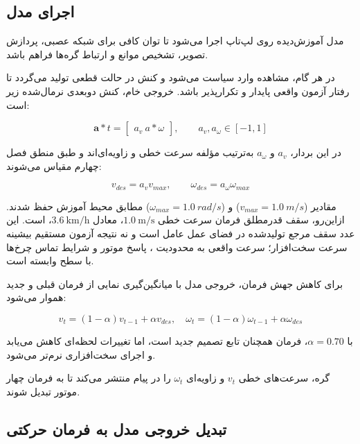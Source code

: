 \subsection{اجرای مدل }
\label{subsec:real_lstm_sac_execution}

مدل آموزش‌دیده روی لپ‌تاپ اجرا می‌شود تا توان کافی برای شبکه عصبی، پردازش تصویر، تشخیص موانع و ارتباط گره‌ها فراهم باشد.

در هر گام، مشاهده وارد سیاست می‌شود و کنش در حالت قطعی تولید می‌گردد تا رفتار آزمون واقعی پایدار و تکرارپذیر باشد. خروجی خام، کنش دوبعدی نرمال‌شده زیر است:

\begin{equation}
	\mathbf{a}*t =
	\begin{bmatrix}
		a_v \
		a*\omega
	\end{bmatrix},
	\qquad
	a_v,a_\omega \in [-1,1]
	\label{eq:real_policy_action}
\end{equation}

در این بردار، $a_v$ و $a_\omega$ به‌ترتیب مؤلفه سرعت خطی و زاویه‌ای‌اند و طبق منطق فصل چهارم مقیاس می‌شوند:

\begin{equation}
	v_{des} = a_v v_{max},
	\qquad
	\omega_{des} = a_\omega \omega_{max}
	\label{eq:real_action_scaling}
\end{equation}

مقادیر ($v_{max}=1.0~m/s$) و ($\omega_{max}=1.0~rad/s$) مطابق محیط آموزش حفظ شدند.
ازاین‌رو، سقف قدرمطلق فرمان سرعت خطی $1.0~\mathrm{m/s}$، معادل $3.6~\mathrm{km/h}$، است. این عدد سقف مرجع تولیدشده در فضای عمل عامل است و نه نتیجه آزمون مستقیم بیشینه سرعت سخت‌افزار؛ سرعت واقعی به محدودیت ، پاسخ موتور و شرایط تماس چرخ‌ها با سطح وابسته است.


برای کاهش جهش فرمان، خروجی مدل با میانگین‌گیری نمایی از فرمان قبلی و جدید هموار می‌شود:

\begin{equation}
	v_t =
	(1-\alpha)v_{t-1}
	+
	\alpha v_{des}, \quad
	\omega_t =
	(1-\alpha)\omega_{t-1}
	+
	\alpha \omega_{des}
	\label{eq:real_w_and_v_smoothing}
\end{equation}

با $\alpha=0.70$، فرمان همچنان تابع تصمیم جدید است، اما تغییرات لحظه‌ای کاهش می‌یابد و اجرای سخت‌افزاری نرم‌تر می‌شود.

گره، سرعت‌های خطی $v_t$ و زاویه‌ای $\omega_t$ را در پیام  منتشر می‌کند تا به فرمان چهار موتور تبدیل شوند.

\subsection{تبدیل خروجی مدل به فرمان حرکتی}
\label{subsec:real_action_to_motion_command}

